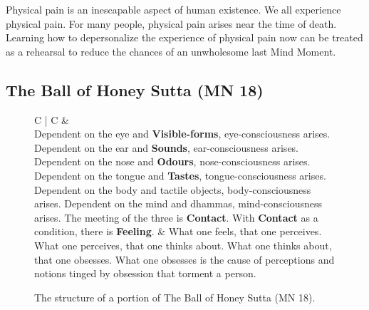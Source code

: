 Physical pain is an inescapable aspect of human existence. We all experience physical pain. For many people, physical pain arises near the time of death. Learning how to depersonalize the experience of physical pain now can be treated as a rehearsal to reduce the chances of an unwholesome last Mind Moment.

\subsection*{The Ball of Honey Sutta (MN 18)}

\begin{figure}[H]
\begin{tabular*}{\textwidth}{C{\tabcolsep} | C{\tabcolsep}}
\toprule
{} &  \\
\midrule
 Dependent on the eye and \textbf{Visible-forms}, eye-consciousness arises.\newline
 Dependent on the ear and \textbf{Sounds}, ear-consciousness arises.\newline
 Dependent on the nose and \textbf{Odours}, nose-consciousness arises.\newline
 Dependent on the tongue and \textbf{Tastes}, tongue-consciousness arises.\newline
 Dependent on the body and tactile objects, body-consciousness arises.\newline
 Dependent on the mind and dhammas, mind-consciousness arises.
 \newline\vspace{5mm}
 The meeting of the three is \textbf{Contact}.
 \newline\vspace{5mm}
 With \textbf{Contact} as a condition, there is \textbf{Feeling}.
 &
 What one feels, that one perceives.\newline
 What one perceives, that one thinks about.\newline
 What one thinks about, that one obsesses.\newline
 What one obsesses is the cause of perceptions and notions tinged by obsession that torment a person.
 \\
 
\bottomrule
\end{tabular*}
\caption{The structure of a portion of The Ball of Honey Sutta (MN 18).}
\label{Honey}
\end{figure}

